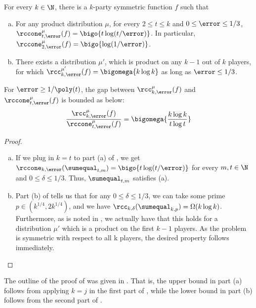 \begin{corollary}\label{corollary:log-separation}
For every $k\in \N$, there is a $k$-party symmetric function $f$ such that

\begin{enumerate}[(a)]
	\item For any product distribution $\mu$, 
              for every $2\le t\le k$ and $0\le \error \le 1/3$, 
	$\rccone_{t,\error}^{\mu}(f)=\bigo{t\log(t/\error)}$.
%
	In particular, $\rccone_{2,\error}^{\mu}(f)=\bigo{\log(1/\error)}$.

	\item There exists a distribution $\mu'$, which is product on any
              $k-1$ out of $k$ players, for which 
              $\rcc_{k,\error}^{\mu'}(f)= \bigomega{k\log k}$ 
              as long as $\error \le 1/3$.	
\end{enumerate}
\end{corollary}

For $\error\ge 1/\poly(t)$,  
the gap between $\rcc_{k,\error}^{\mu}(f)$ and $\rccone_{t,\error}^{\mu}(f)$ is bounded as below:
\[\frac{\rcc_{k,\error}^{\mu}(f)} {\rccone_{t,\error}^{\mu}(f)} = \bigomega{\frac{k\log k}{t\log t}}\]

{\color{black}
\begin{proof}
\begin{enumerate}[(a)]
    \item If we plug in $k=t$ to part (a) of , we get $\rccone_{k,\error}(\sumequal_{t,m}) = \bigo{t\log (t/\error)}$ for every $m,t \in \N$ and $0 \le \delta \le 1/3$. Thus, $\sumequal_{t,m}$ satisfies (a).
    \item Part (b) of  tells us that for any $0 \le \delta \le 1/3$, we can take some prime $p \in (k^{1/4},2k^{1/4})$, and we have $\rcc_{k,\delta}(\sumequal_{k,p}) = \Omega(k\log k)$. Furthermore, as is noted in , we actually have that this holds for a distribution $\mu'$ which is a product on the first $k-1$ players. As the \sumequal problem is symmetric with respect to all k players, the desired property follows immediately.
\end{enumerate}
\end{proof}
}

The outline of the proof of  was given in .
That is, the upper bound in part (a) follows from applying $k = j$ in 
the first part of ,
while the lower bound in part (b) follows from the second part of . 


